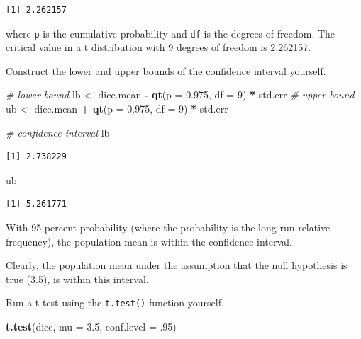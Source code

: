 \documentclass[]{article}
\newenvironment{Shaded}{\begin{snugshade}}{\end{snugshade}}
\newcommand{\KeywordTok}[1]{\textcolor[rgb]{0.13,0.29,0.53}{\textbf{#1}}}
\newcommand{\DataTypeTok}[1]{\textcolor[rgb]{0.13,0.29,0.53}{#1}}
\newcommand{\DecValTok}[1]{\textcolor[rgb]{0.00,0.00,0.81}{#1}}
\newcommand{\FloatTok}[1]{\textcolor[rgb]{0.00,0.00,0.81}{#1}}
\newcommand{\StringTok}[1]{\textcolor[rgb]{0.31,0.60,0.02}{#1}}
\newcommand{\CommentTok}[1]{\textcolor[rgb]{0.56,0.35,0.01}{\textit{#1}}}
\newcommand{\OperatorTok}[1]{\textcolor[rgb]{0.81,0.36,0.00}{\textbf{#1}}}
\newcommand{\NormalTok}[1]{#1}
\theoremstyle{definition}
\theoremstyle{definition}
\theoremstyle{definition}
\theoremstyle{remark}
\begin{document}
\begin{verbatim}
[1] 2.262157
\end{verbatim}

where \texttt{p} is the cumulative probability and \texttt{df} is the
degrees of freedom. The critical value in a t distribution with 9
degrees of freedom is 2.262157.

Construct the lower and upper bounds of the confidence interval
yourself.

\begin{Shaded}
\begin{Highlighting}[]
\CommentTok{# lower bound}
\NormalTok{lb <-}\StringTok{ }\NormalTok{dice.mean }\OperatorTok{-}\StringTok{ }\KeywordTok{qt}\NormalTok{(}\DataTypeTok{p =} \FloatTok{0.975}\NormalTok{, }\DataTypeTok{df =} \DecValTok{9}\NormalTok{) }\OperatorTok{*}\StringTok{ }\NormalTok{std.err}
\CommentTok{# upper bound}
\NormalTok{ub <-}\StringTok{ }\NormalTok{dice.mean }\OperatorTok{+}\StringTok{ }\KeywordTok{qt}\NormalTok{(}\DataTypeTok{p =} \FloatTok{0.975}\NormalTok{, }\DataTypeTok{df =} \DecValTok{9}\NormalTok{) }\OperatorTok{*}\StringTok{ }\NormalTok{std.err}

\CommentTok{# confidence interval}
\NormalTok{lb}
\end{Highlighting}
\end{Shaded}

\begin{verbatim}
[1] 2.738229
\end{verbatim}

\begin{Shaded}
\begin{Highlighting}[]
\NormalTok{ub}
\end{Highlighting}
\end{Shaded}

\begin{verbatim}
[1] 5.261771
\end{verbatim}

With 95 percent probability (where the probability is the long-run
relative frequency), the population mean is within the confidence
interval.

Clearly, the population mean under the assumption that the null
hypothesis is true (3.5), is within this interval.

Run a t test using the \texttt{t.test()} function yourself.

\begin{Shaded}
\begin{Highlighting}[]
\KeywordTok{t.test}\NormalTok{(dice,}
       \DataTypeTok{mu =} \FloatTok{3.5}\NormalTok{,}
       \DataTypeTok{conf.level =}\NormalTok{ .}\DecValTok{95}\NormalTok{)}
\end{Highlighting}
\end{Shaded}
\end{document}
